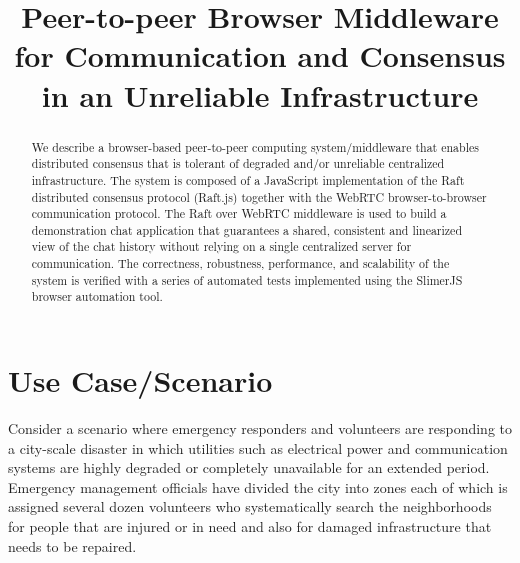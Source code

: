 \documentclass[conference,compsoc]{./IEEEtran/IEEEtran}
\begin{document}
\title{Peer-to-peer Browser Middleware\\
       for Communication and Consensus in an Unreliable Infrastructure}

\author{
\and
{}
}

\maketitle

\begin{abstract}
We describe a browser-based peer-to-peer computing system/middleware that enables distributed consensus that is tolerant of degraded and/or unreliable centralized infrastructure. The system is composed of a JavaScript implementation of the Raft distributed consensus protocol (Raft.js) together with the WebRTC browser-to-browser communication protocol. The Raft over WebRTC middleware is used to build a demonstration chat application that guarantees a shared, consistent and linearized view of the chat history without relying on a single centralized server for communication. The correctness, robustness, performance, and scalability of the system is verified with a series of automated tests implemented using the SlimerJS browser automation tool.
\end{abstract}

\section{Use Case/Scenario}
Consider a scenario where emergency responders and volunteers are responding to a city-scale disaster in which utilities such as electrical power and communication systems are highly degraded or completely unavailable for an extended period. Emergency management officials have divided the city into zones each of which is assigned several dozen volunteers who systematically search the neighborhoods for people that are injured or in need and also for damaged infrastructure that needs to be repaired.
\end{document}
